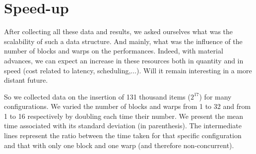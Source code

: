 
\section{Speed-up}

After collecting all these data and results, we asked ourselves what was the scalability of such a data structure. And mainly, what was the influence of the number of blocks and warps on the performances. Indeed, with material advances, we can expect an increase in these resources both in quantity and in speed (cost related to latency, scheduling,...). Will it remain interesting in a more distant future.

So we collected data on the insertion of 131 thousand items ($2^{17}$) for many configurations. We varied the number of blocks and warps from 1 to 32 and from 1 to 16 respectively by doubling each time their number. We present the mean time associated with its standard deviation (in parenthesis). The intermediate lines represent the ratio between the time taken for that specific configuration and that with only one block and one warp (and therefore non-concurrent).

